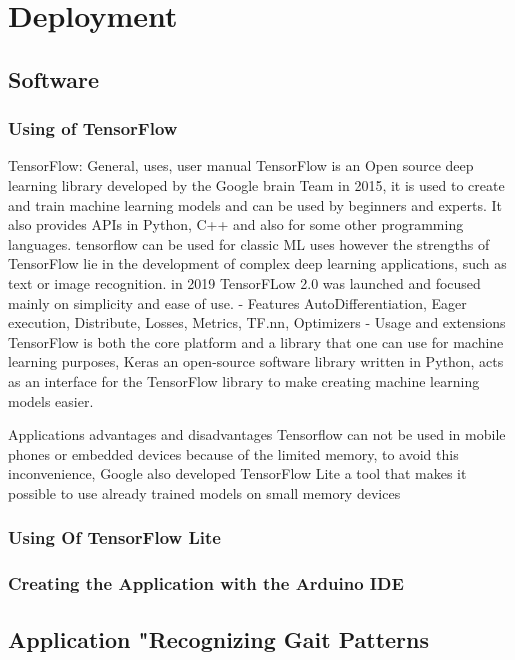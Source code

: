 
%
%

\chapter{Deployment}
\section{Software}
\subsection{Using of TensorFlow}
TensorFlow: General, uses, user manual  
TensorFlow is an Open source deep learning library developed by the Google brain Team in 2015, it is used to create and train machine learning models and can be used by beginners and experts. 
It also provides APIs in Python, C++ and also for some other programming languages.
tensorflow can be used for classic ML uses however the strengths of TensorFlow lie in the development of complex deep learning applications, such as text or image recognition.
in 2019 TensorFLow 2.0 was launched and focused mainly on simplicity and ease of use. 
- Features
AutoDifferentiation, Eager execution, Distribute, Losses, Metrics, TF.nn, Optimizers
- Usage and extensions
TensorFlow is both the core platform and a library that one can use for machine learning purposes, Keras an open-source software library written in Python, acts as an interface for the TensorFlow library to make creating machine learning models easier.

Applications
advantages and disadvantages 
Tensorflow can not be used in mobile phones or embedded devices because of the limited memory, 
to avoid this inconvenience, Google also developed TensorFlow Lite a tool that makes it possible to use already trained models on small memory devices 
\subsection{Using Of TensorFlow Lite}
\subsection{Creating the Application with the Arduino IDE}
\section{Application "Recognizing Gait Patterns}
